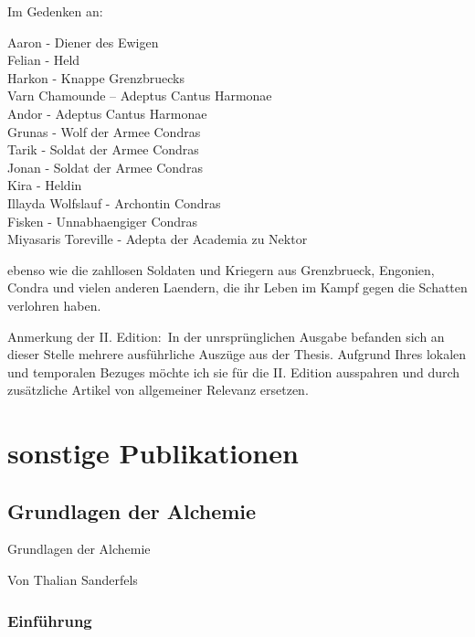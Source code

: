 \documentclass[a5paper,8pt]{book}
\begin{document}
\begin{center}
\begin{Huge}Im Gedenken an:\\\end{Huge}

\vspace{10mm}

Aaron - Diener des Ewigen\\
Felian - Held\\
Harkon - Knappe Grenzbruecks\\
Varn Chamounde – Adeptus Cantus Harmonae\\
Andor - Adeptus Cantus Harmonae\\
Grunas - Wolf der Armee Condras\\
Tarik - Soldat der Armee Condras\\
Jonan - Soldat der Armee Condras\\
Kira - Heldin\\
Illayda Wolfslauf - Archontin Condras\\
Fisken - Unnabhaengiger Condras\\
Miyasaris Toreville - Adepta der Academia zu Nektor\\
\end{center}

\noindent ebenso wie die zahllosen Soldaten und Kriegern aus Grenzbrueck, Engonien, Condra und vielen anderen Laendern, die ihr Leben im Kampf gegen die Schatten verlohren haben.

\noindent Anmerkung der II. Edition:\
In der unrsprünglichen Ausgabe befanden sich an dieser Stelle mehrere ausführliche Auszüge aus der Thesis. Aufgrund Ihres lokalen und temporalen Bezuges möchte ich sie
für die II. Edition ausspahren und durch zusätzliche Artikel von allgemeiner Relevanz ersetzen.


\newpage


\chapter{sonstige Publikationen}

\section{Grundlagen der Alchemie}


Grundlagen der Alchemie


Von Thalian Sanderfels

\subsection{Einführung}
\end{document}
